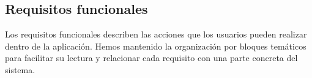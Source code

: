 \documentclass[10pt]{article}
\begin{document}
		
		
		
		
		

		\subsection{Requisitos funcionales}
            Los requisitos funcionales describen las acciones que los usuarios pueden realizar dentro de la aplicación. Hemos mantenido la organización por bloques temáticos para facilitar su lectura y relacionar cada requisito con una parte concreta del sistema.
            
\end{document}
